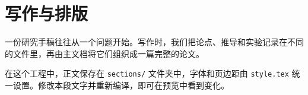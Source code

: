 \section{写作与排版}
一份研究手稿往往从一个问题开始。写作时，我们把论点、推导和实验记录在不同的文件里，再由主文档将它们组织成一篇完整的论文。

在这个工程中，正文保存在 \texttt{sections/} 文件夹中，字体和页边距由 \texttt{style.tex} 统一设置。修改本段文字并重新编译，即可在预览中看到变化。
